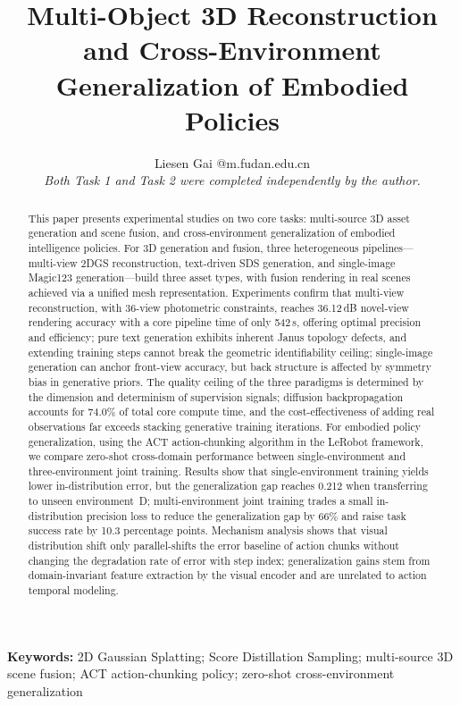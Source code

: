 \documentclass[10pt,twocolumn,letterpaper]{article}
\title{{\cvprboldfont Multi-Object 3D Reconstruction and Cross-Environment Generalization of Embodied Policies}}
\author{%
  Liesen Gai \quad 23307130013@m.fudan.edu.cn\\[0.25em]
  \textit{Both Task 1 and Task 2 were completed independently by the author.}\\[0.25em]
}
\begin{document}
\maketitle

\begin{abstract}
This paper presents experimental studies on two core tasks: multi-source 3D asset generation and scene fusion, and cross-environment generalization of embodied intelligence policies.
For 3D generation and fusion, three heterogeneous pipelines---multi-view 2DGS reconstruction, text-driven SDS generation, and single-image Magic123 generation---build three asset types, with fusion rendering in real scenes achieved via a unified mesh representation. Experiments confirm that multi-view reconstruction, with 36-view photometric constraints, reaches 36.12\,dB novel-view rendering accuracy with a core pipeline time of only 542\,s, offering optimal precision and efficiency; pure text generation exhibits inherent Janus topology defects, and extending training steps cannot break the geometric identifiability ceiling; single-image generation can anchor front-view accuracy, but back structure is affected by symmetry bias in generative priors. The quality ceiling of the three paradigms is determined by the dimension and determinism of supervision signals; diffusion backpropagation accounts for 74.0\% of total core compute time, and the cost-effectiveness of adding real observations far exceeds stacking generative training iterations.
For embodied policy generalization, using the ACT action-chunking algorithm in the LeRobot framework, we compare zero-shot cross-domain performance between single-environment and three-environment joint training. Results show that single-environment training yields lower in-distribution error, but the generalization gap reaches 0.212 when transferring to unseen environment~D; multi-environment joint training trades a small in-distribution precision loss to reduce the generalization gap by 66\% and raise task success rate by 10.3 percentage points. Mechanism analysis shows that visual distribution shift only parallel-shifts the error baseline of action chunks without changing the degradation rate of error with step index; generalization gains stem from domain-invariant feature extraction by the visual encoder and are unrelated to action temporal modeling.
\end{abstract}

\noindent\textbf{Keywords:} 2D Gaussian Splatting; Score Distillation Sampling; multi-source 3D scene fusion; ACT action-chunking policy; zero-shot cross-environment generalization
\vspace{0.2em}
\end{document}
